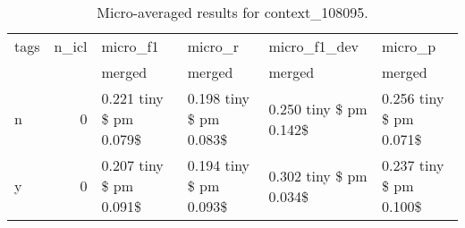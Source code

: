 \begin{table}
\caption{Micro-averaged results for context_108095.}
\label{results-micro-overall}
\begin{tabular}{lrllll}
\toprule
tags & n\_icl & micro\_f1 & micro\_r & micro\_f1\_dev & micro\_p \\
 &  & merged & merged & merged & merged \\
\midrule
n & 0 & 0.221 tiny \$ pm 0.079\$ & 0.198 tiny \$ pm 0.083\$ & 0.250 tiny \$ pm 0.142\$ & 0.256 tiny \$ pm 0.071\$ \\
y & 0 & 0.207 tiny \$ pm 0.091\$ & 0.194 tiny \$ pm 0.093\$ & 0.302 tiny \$ pm 0.034\$ & 0.237 tiny \$ pm 0.100\$ \\
\bottomrule
\end{tabular}
\end{table}
